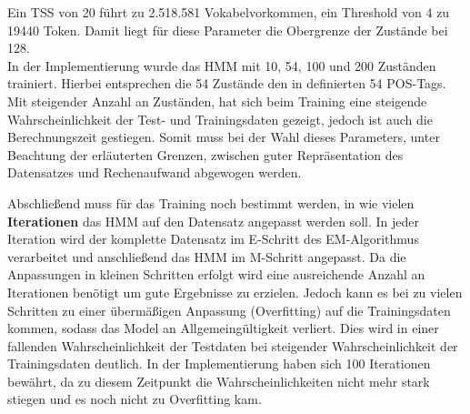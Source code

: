 \documentclass[conference]{IEEEtran}
\begin{document}
Ein TSS von 20 führt zu 2.518.581 Vokabelvorkommen, ein Threshold von 4 zu 19440 Token. 
Damit liegt für diese Parameter die Obergrenze der Zustände bei 128. \\
In der Implementierung wurde das HMM mit 10, 54, 100 und 200 Zuständen trainiert.
Hierbei entsprechen die 54 Zustände den in \cite{germanCorpus} definierten 54 POS-Tags.
Mit steigender Anzahl an Zuständen, hat sich beim Training eine steigende Wahrscheinlichkeit der Test- und Trainingsdaten gezeigt, jedoch ist auch die Berechnungszeit gestiegen.
Somit muss bei der Wahl dieses Parameters, unter Beachtung der erläuterten Grenzen, zwischen guter Repräsentation des Datensatzes und Rechenaufwand abgewogen werden.

Abschließend muss für das Training noch bestimmt werden, in wie vielen \textbf{Iterationen} das HMM auf den Datensatz angepasst werden soll. 
In jeder Iteration wird der komplette Datensatz im E-Schritt des EM-Algorithmus verarbeitet und anschließend das HMM im M-Schritt angepasst.
Da die Anpassungen in kleinen Schritten erfolgt wird eine ausreichende Anzahl an Iterationen benötigt um gute Ergebnisse zu erzielen.
Jedoch kann es bei zu vielen Schritten zu einer übermäßigen Anpassung (Overfitting) auf die Trainingsdaten kommen, sodass das Model an Allgemeingültigkeit verliert.
Dies wird in einer fallenden Wahrscheinlichkeit der Testdaten bei steigender Wahrscheinlichkeit der Trainingsdaten deutlich.
In der Implementierung haben sich 100 Iterationen bewährt, da zu diesem Zeitpunkt die Wahrscheinlichkeiten nicht mehr stark stiegen und es noch nicht zu Overfitting kam. 
\end{document}
